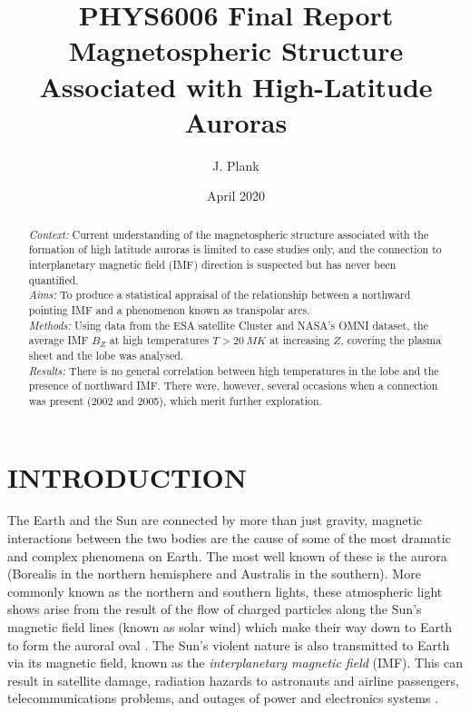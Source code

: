 \documentclass[12pt]{article}
\title{PHYS6006 Final Report \\
       Magnetospheric Structure Associated with High-Latitude Auroras}
\author{J. Plank}
\affil{Department of Physics and Astronomy,\\University of Southampton}
\date{April 2020}
\begin{document}
\sloppy
\maketitle

\begin{abstract}
    \noindent\textit{Context:} Current understanding of the magnetospheric structure associated with the formation of high latitude auroras is limited to case studies only, and the connection to interplanetary magnetic field (IMF) direction is suspected but has never been quantified.\\
    \textit{Aims:} To produce a statistical appraisal of the relationship between a northward pointing IMF and a phenomenon known as transpolar arcs.\\
    \textit{Methods:} Using data from the ESA satellite Cluster and NASA's OMNI dataset, the average IMF $B_Z$ at high temperatures $T>20\ MK$ at increasing $Z$, covering the plasma sheet and the lobe was analysed. \\
    \textit{Results:} There is no general correlation between high temperatures in the lobe and the presence of northward IMF. There were, however, several occasions when a connection was present (2002 and 2005), which merit further exploration.
\end{abstract}

\pagebreak

\tableofcontents
{}

\pagebreak


\section{INTRODUCTION}
 The Earth and the Sun are connected by more than just gravity, magnetic interactions between the two bodies are the cause of some of the most dramatic and complex phenomena on Earth. The most well known of these is the aurora (Borealis in the northern hemisphere and Australis in the southern). More commonly known as the northern and southern lights, these atmospheric light shows arise from the result of the flow of charged particles along the Sun's magnetic field lines (known as solar wind) which make their way down to Earth to form the auroral oval \cite{AAAspaceweather}. The Sun's violent nature is also transmitted to Earth via its magnetic field, known as the \textit{interplanetary magnetic field} (IMF). This can result in satellite damage, radiation hazards to astronauts and airline passengers, telecommunications problems, and outages of power and electronics systems \cite{AAAspaceweather}.
\end{document}
